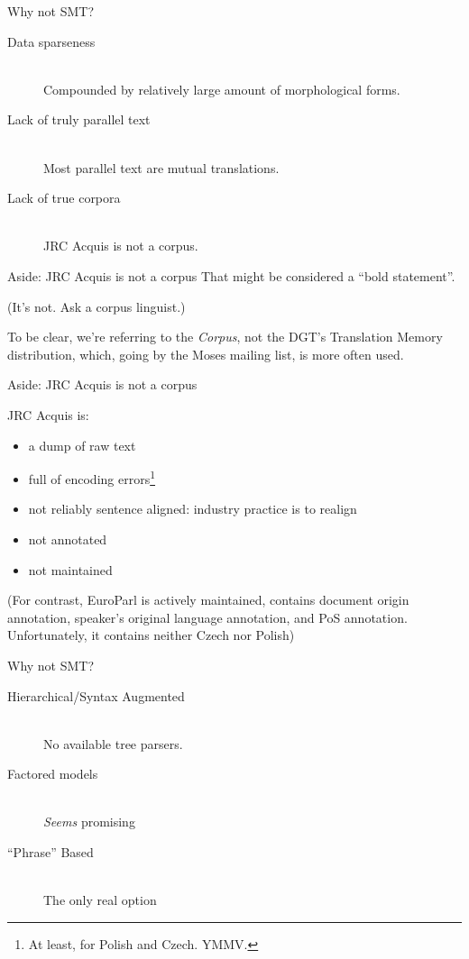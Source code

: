 \documentclass{beamer}
\begin{document}
\begin{frame}{Why not SMT?}
\begin{description}
  \item[Data sparseness] \hfill \\
  Compounded by relatively large amount of morphological forms.
  \item[Lack of truly parallel text] \hfill \\
  Most parallel text are mutual translations.
  \item[Lack of true corpora] \hfill \\
  JRC Acquis is not a corpus.
\end{description}

\end{frame}

\begin{frame}{Aside: JRC Acquis is not a corpus}
That might be considered a ``bold statement''.

(It's not. Ask a corpus linguist.)

\hbox{}

{\footnotesize To be clear, we're referring to the {\em Corpus}, not the DGT's Translation
Memory distribution, which, going by the Moses mailing list, is more often
used.}
\end{frame}

\begin{frame}{Aside: JRC Acquis is not a corpus}

JRC Acquis is:

\begin{itemize}
\item a dump of raw text
\item full of encoding errors\footnote{At least, for Polish and Czech. YMMV.}
\item not reliably sentence aligned: industry practice is to realign
\item not annotated
\item not maintained
\end{itemize}

{\footnotesize (For contrast, EuroParl is actively maintained, contains document origin annotation, 
speaker's original language annotation, and PoS annotation. Unfortunately, it contains
neither Czech nor Polish)}
\end{frame}
\begin{frame}{Why not SMT?}
\begin{description}
  \item[Hierarchical/Syntax Augmented] \hfill \\
  No available tree parsers.
  \item[Factored models] \hfill \\
  {\em Seems} promising
  \item[``Phrase'' Based] \hfill \\
  The only real option
\end{description}
\end{frame}
\end{document}
